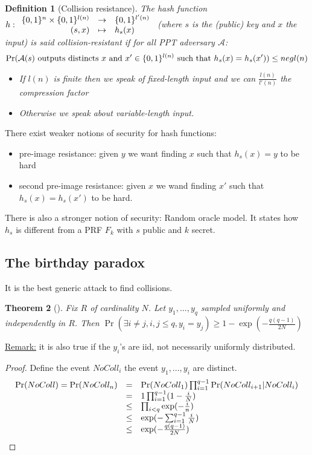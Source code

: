 \documentclass{article}
\newtheorem{thm}{Theorem}[section]
\newtheorem{defi}[thm]{Definition}
\newcommand{\Thm}[3]{\begin{thm}[#1]\label{#2}#3\end{thm}}
\newcommand{\Def}[3]{\begin{defi}[#1]\label{#2}#3\end{defi}}
\newcommand{\Rem}{\underline{Remark:} }
\newcommand{\A}{\mathcal{A}}
\newcommand{\bit}{\{0,1\}}
\begin{document}
\Def{Collision resistance}{def:collisionResist}{The hash function $h:\begin{array}{r c l}
\bit^n\times\bit^{l(n)}&\rightarrow&\bit^{l'(n)}\\
(s,x) & \mapsto & h_s(x)
\end{array}$ (where $s$ is the (public) key and $x$ the input) is said collision-resistant if for all PPT adversary $\A$:
 \[\Pr(\A(s)\text{ outputs distincts $x$ and $x'\in\bit^{l(n)}$ such that $ h_s(x)=h_s(x')$})\leq negl(n) \]
 
 \begin{itemize}
 \item If $l(n)$ is finite then we speak of fixed-length input and we can $\frac{l(n)}{l'(n)}$ the compression factor
 \item Otherwise we speak about variable-length input.
 \end{itemize}}
 
There exist weaker notions of security for hash functions:\begin{itemize}
\item pre-image resistance: given $y$ we want finding $x$ such that $h_s(x)=y$ to be hard
\item second pre-image resistance: given $x$ we wand finding $x'$ such that $h_s(x)=h_s(x')$ to be hard.
\end{itemize}

There is also a stronger notion of security: Random oracle model. It states how $h_s$ is different from a PRF $F_k$ with $s$ public and $k$ secret.

\subsection{The birthday paradox}
It is the best generic attack to find collisions.
\Thm{}{}{Fix $R$ of cardinality $N$. Let $y_1,...,y_q$ sampled uniformly and independently in $R$. Then $\Pr(\exists i\neq j, i,j\leq q, y_i=y_j)\geq 1-\exp(-\frac{q(q-1)}{2N})$}

\Rem it is also true if the $y_i$'s are iid, not necessarily uniformly  distributed.

\begin{proof}
Define the event $NoColl_i$ the event $y_1,...,y_i$ are distinct.
\[\begin{array}{r c l}
\Pr(NoColl)=\Pr(NoColl_n) &=& \Pr(NoColl_1)\prod_{i=1}^{q-1}\Pr(NoColl_{i+1}|NoColl_i)\\
&=& 1\prod_{i=1}^{q-1}(1-\frac{i}{N})\\
&\leq& \prod_{i<q}\exp(-\frac{i}{n})\\
&\leq& \exp(-\sum_{i=1}^{q-1}\frac{i}{N})\\
&\leq& \exp(-\frac{q(q-1)}{2N})
\end{array}\]
\end{proof}
\end{document}
